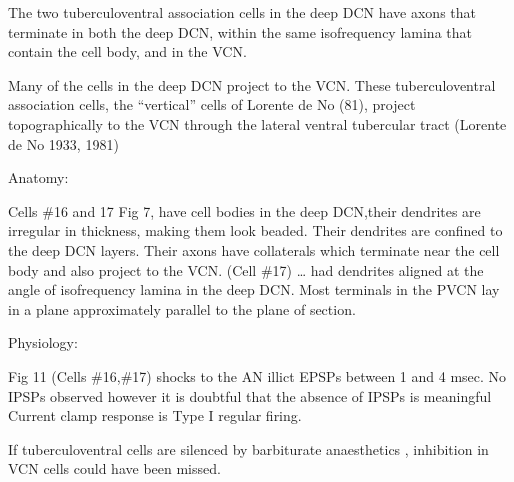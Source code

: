 \documentclass[10pt,a4paper]{article}
\begin{document}
The two tuberculoventral association cells in the deep DCN have axons that
terminate in both the deep DCN, within the same isofrequency lamina that contain
the cell body, and in the VCN.

Many of the cells in the deep DCN project to the VCN.  These tuberculoventral
association cells, the ``vertical'' cells of
Lorente de No (81), project topographically to the VCN through the lateral
ventral tubercular tract (Lorente de No{\textasciigrave} 1933, 1981)

Anatomy:

Cells \#16 and 17 Fig 7, have cell bodies in the deep DCN,their dendrites are
irregular in thickness, making them look beaded.  Their dendrites are confined
to the deep DCN layers.  Their axons have collaterals which terminate near the
cell body and also project to the VCN.  (Cell \#17) {\dots} had dendrites
aligned at the angle of isofrequency lamina in the deep DCN.  Most terminals in
the PVCN lay in a plane approximately parallel to the plane of section.

Physiology:

Fig 11 (Cells \#16,\#17) shocks to the AN illict EPSPs between 1 and 4 msec.  No
IPSPs observed however it is doubtful that the absence of IPSPs is meaningful
Current clamp response is Type I regular firing.

If tuberculoventral cells are silenced by barbiturate anaesthetics
\citep{EvansNelson:1973,RhodeOertelEtAl:1983a,RhodeOertelEtAl:1983,YoungBrownell:1976},
inhibition in VCN cells could have been missed.

\citep{ReissYoung:2005}
\end{document}
